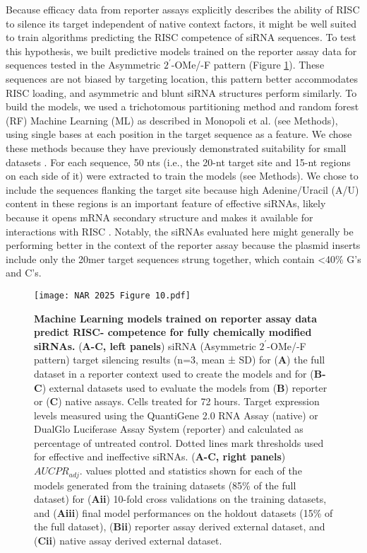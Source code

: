 \documentclass{report}
\begin{document}
Because efficacy data from reporter assays explicitly describes the ability of RISC to silence its target independent of native context factors, it might be well suited to train algorithms predicting the RISC competence of siRNA sequences. To test this hypothesis, we built predictive models trained on the reporter assay data for sequences tested in the Asymmetric $2^\prime$-OMe/-F pattern (Figure \ref{fig:Figure** 10}). These sequences are not biased by targeting location, this pattern better accommodates RISC loading, and asymmetric and blunt siRNA structures perform similarly. To build the models, we used a trichotomous partitioning method and random forest (RF) Machine Learning (ML) as described in Monopoli et al. \cite{monopoli_asymmetric_2023} (see Methods), using single bases at each position in the target sequence as a feature. We chose these methods because they have previously demonstrated suitability for small datasets \cite{monopoli_asymmetric_2023}. For each sequence, 50 nts (i.e., the 20-nt target site and 15-nt regions on each side of it) were extracted to train the models (see Methods). We chose to include the sequences flanking the target site because high Adenine/Uracil (A/U) content in these regions is an important feature of effective siRNAs, likely because it opens mRNA secondary structure and makes it available for interactions with RISC \cite{shmushkovich_functional_2018}. Notably, the siRNAs evaluated here might generally be performing better in the context of the reporter assay because the plasmid inserts include only the 20mer target sequences strung together, which contain <40\% G’s and C’s.


\begin{figure}
    \centering
    \texttt{[image: NAR 2025 Figure 10.pdf]}
    \caption{\textbf{Machine Learning models trained on reporter assay data predict RISC- competence for fully chemically modified siRNAs. }(\textbf{A-C, left panels}) siRNA (Asymmetric $2^\prime$-OMe/-F pattern) target silencing results (n=3, mean ± SD) for (\textbf{A}) the full dataset in a reporter context used to create the models and for (\textbf{B-C}) external datasets used to evaluate the models from (\textbf{B}) reporter or (\textbf{C}) native assays. Cells treated for 72 hours. Target expression levels measured using the QuantiGene 2.0 RNA Assay (native) or DualGlo Luciferase Assay System (reporter) and calculated as percentage of untreated control. Dotted lines mark thresholds used for effective and ineffective siRNAs. (\textbf{A-C, right panels}) $AUCPR_{adj}$. values plotted and statistics shown for each of the models generated from the training datasets (85\% of the full dataset) for (\textbf{Aii}) 10-fold cross validations on the training datasets, and (\textbf{Aiii}) final model performances on the holdout datasets (15\% of the full dataset), (\textbf{Bii}) reporter assay derived external dataset, and (\textbf{Cii}) native assay derived external dataset.
}
    \label{fig:Figure** 10}
\end{figure}
\end{document}
